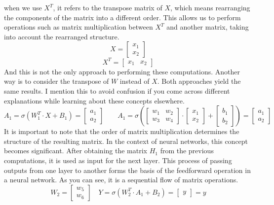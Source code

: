 when we use $X^T$, it refers to the transpose matrix of $X$, which means rearranging the components of the
matrix into a different order. This allows us to perform operations such as matrix multiplication
between $X^T$ and another matrix, taking into account the rearranged structure.
\[
X = \begin{bmatrix} x_1 \\ x_2 \end{bmatrix}
\]
\[
X^T = \begin{bmatrix} x_1 & x_2 \end{bmatrix}
\]
And this is not the only approach to performing these computations. Another way is to consider the transpose
of $W$ instead of $X$. Both approaches yield the same results. I mention this to avoid confusion if you come
across different explanations while learning about these concepts elsewhere.
\[
A_1 = \sigma(W_1^T \cdot X + B_1) = \begin{bmatrix} a_1 \\ a_2 \end{bmatrix}
\quad \quad A_1 = \sigma(\begin{bmatrix} w_1 & w_2 \\ w_3 & w_4 \end{bmatrix} \cdot
\begin{bmatrix} x_1 \\ x_2 \end{bmatrix} + \begin{bmatrix} b_1 \\ b_2 \end{bmatrix}) =
\begin{bmatrix} a_1 \\ a_2 \end{bmatrix}
\]
It is important to note that the order of matrix multiplication determines the structure of the resulting
matrix. In the context of neural networks, this concept becomes significant. After obtaining the matrix $H_1$
from the previous computations, it is used as input for the next layer. This process of passing outputs from
one layer to another forms the basis of the feedforward operation in a neural network. As you can see, it is
a sequential flow of matrix operations.
\[
W_2 = \begin{bmatrix} w_5 \\ w_6 \end{bmatrix} \quad
Y = \sigma(W_2^T\cdot A_1 + B_2) = \begin{bmatrix} y \end{bmatrix} = y
\]


